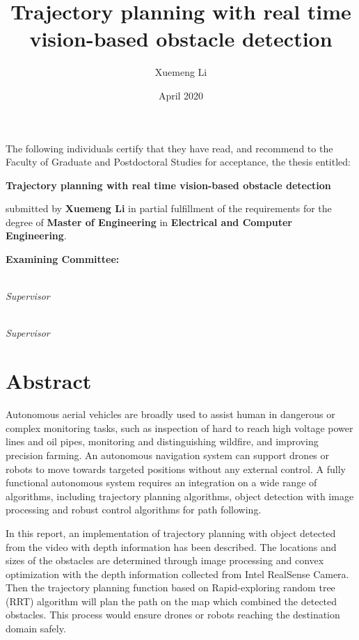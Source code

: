 \documentclass[
  oneside]{ubcthesis}
\title{Trajectory planning with real time vision-based obstacle detection}
\author{Xuemeng Li}
\date{April 2020}
\begin{document}
\maketitle


\noindent The following individuals certify that they have read,
and recommend to the Faculty of Graduate and Postdoctoral Studies
for acceptance, the thesis entitled:

\begin{center}
{\large \textbf{Trajectory planning with real time vision-based obstacle detection}}
\end{center}

submitted by \textbf{Xuemeng Li} in partial fulfillment of the requirements for the degree of \textbf{Master of Engineering} in \textbf{Electrical and Computer Engineering}.%
\par\bigskip%

\noindent\textbf{Examining Committee:}%
\par\medskip{}\\\emph{Supervisor}
\par\medskip{}\\\emph{Supervisor}
\cleardoublepage

\chapter{Abstract}

Autonomous aerial vehicles are broadly used to assist human in dangerous or complex monitoring tasks, such as inspection of hard to reach high voltage power lines and oil pipes, monitoring and distinguishing wildfire, and improving precision farming. An autonomous navigation system can support drones or robots to move towards targeted positions without any external control. A fully functional autonomous system requires an integration on a wide range of algorithms, including trajectory planning algorithms, object detection with image processing and robust control algorithms for path following. 

In this report, an implementation of trajectory planning with object detected from the video with depth information has been described. The locations and sizes of the obstacles are determined through image processing and convex optimization with the depth information collected from Intel RealSense Camera. Then the trajectory planning function based on Rapid-exploring random tree (RRT) algorithm will plan the path on the map which combined the detected obstacles. This process would ensure drones or robots reaching the destination domain safely.
\end{document}
